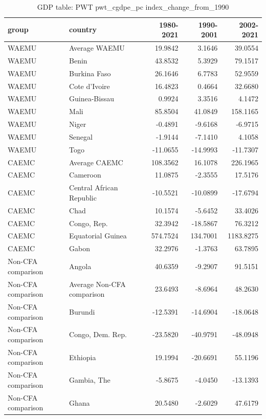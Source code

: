 \begin{table}

\caption{GDP table: PWT pwt_cgdpe_pc index_change_from_1990}
\centering
\begin{tabular}[t]{llrrr}
\toprule
group & country & 1980-2021 & 1990-2001 & 2002-2021\\
\midrule
WAEMU & Average WAEMU & 19.9842 & 3.1646 & 39.0554\\
WAEMU & Benin & 43.8532 & 5.3929 & 79.1517\\
WAEMU & Burkina Faso & 26.1646 & 6.7783 & 52.9559\\
WAEMU & Cote d'Ivoire & 16.4823 & 0.4664 & 32.6680\\
WAEMU & Guinea-Bissau & 0.9924 & 3.3516 & 4.1472\\
\addlinespace
WAEMU & Mali & 85.8504 & 41.0849 & 158.1165\\
WAEMU & Niger & -0.4891 & -9.6168 & -6.9715\\
WAEMU & Senegal & -1.9144 & -7.1410 & 4.1058\\
WAEMU & Togo & -11.0655 & -14.9993 & -11.7307\\
CAEMC & Average CAEMC & 108.3562 & 16.1078 & 226.1965\\
\addlinespace
CAEMC & Cameroon & 11.0875 & -2.3555 & 17.5176\\
CAEMC & Central African Republic & -10.5521 & -10.0899 & -17.6794\\
CAEMC & Chad & 10.1574 & -5.6452 & 33.4026\\
CAEMC & Congo, Rep. & 32.3942 & -18.5867 & 76.3212\\
CAEMC & Equatorial Guinea & 574.7524 & 134.7001 & 1183.8275\\
\addlinespace
CAEMC & Gabon & 32.2976 & -1.3763 & 63.7895\\
Non-CFA comparison & Angola & 40.6359 & -9.2907 & 91.5151\\
Non-CFA comparison & Average Non-CFA comparison & 23.6493 & -8.6964 & 48.2630\\
Non-CFA comparison & Burundi & -12.5391 & -14.6904 & -18.0648\\
Non-CFA comparison & Congo, Dem. Rep. & -23.5820 & -40.9791 & -48.0948\\
\addlinespace
Non-CFA comparison & Ethiopia & 19.1994 & -20.6691 & 55.1196\\
Non-CFA comparison & Gambia, The & -5.8675 & -4.0450 & -13.1393\\
Non-CFA comparison & Ghana & 20.5480 & -2.6029 & 47.6179\\

\end{tabular}
\end{table}
